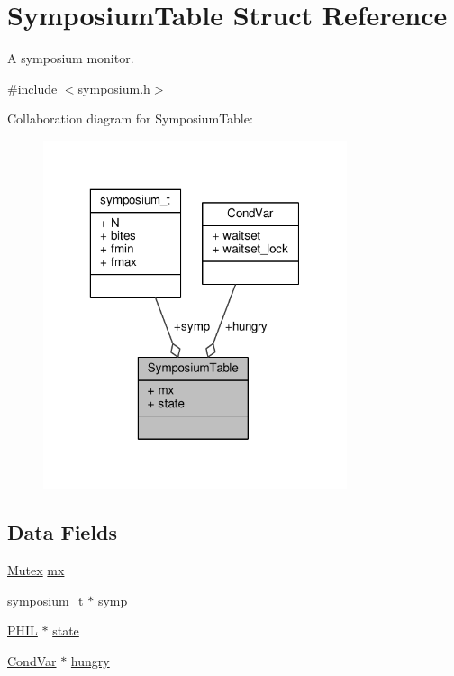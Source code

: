 \hypertarget{structSymposiumTable}{\section{Symposium\-Table Struct Reference}
\label{structSymposiumTable}
}


A symposium monitor.  




{\ttfamily \#include $<$symposium.\-h$>$}



Collaboration diagram for Symposium\-Table\-:
\nopagebreak
\begin{figure}[H]
\begin{center}
\leavevmode
\includegraphics[width=253pt]{structSymposiumTable__coll__graph}
\end{center}
\end{figure}
\subsection*{Data Fields}
\begin{DoxyCompactItemize}
\item 
\hyperlink{group__syscalls_gaef2ec62cae8e0031fd19fc8b91083ade}{Mutex} \hyperlink{structSymposiumTable_a8c36f26f523e6b2f99f6e70fff098de8}{mx}
\item 
\hyperlink{structsymposium__t}{symposium\-\_\-t} $\ast$ \hyperlink{structSymposiumTable_a4089e2778ba23eb79c4785eb5702f70f}{symp}
\item 
\hyperlink{symposium_8h_a9fced5fb7d50a8fa2e8ae45b0cae3520}{P\-H\-I\-L} $\ast$ \hyperlink{structSymposiumTable_a70507f28df670d0db2e59fc65309af08}{state}
\item 
\hyperlink{structCondVar}{Cond\-Var} $\ast$ \hyperlink{structSymposiumTable_a6daa1fdbfe8e836e72bfd6953bc91f6e}{hungry}
\end{DoxyCompactItemize}


